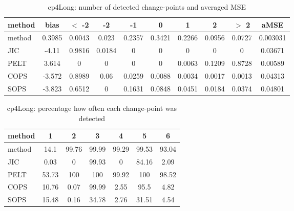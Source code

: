 \begin{table}[ht]
\centering
\begin{tabular}{l|c|ccccccc|c}
  \hline
method & bias & $<$ -2 & -2 & -1 & 0 & 1 & 2 & $>$ 2 & aMSE \\ 
  \hline
method & 0.3985 & 0.0043 & 0.023 & 0.2357 & 0.3421 & 0.2266 & 0.0956 & 0.0727 & 0.003031 \\ 
  JIC & -4.11 & 0.9816 & 0.0184 &     0 &     0 &     0 &     0 &     0 & 0.03671 \\ 
  PELT & 3.614 &     0 &     0 &     0 &     0 & 0.0063 & 0.1209 & 0.8728 & 0.00589 \\ 
  COPS & -3.572 & 0.8989 &  0.06 & 0.0259 & 0.0088 & 0.0034 & 0.0017 & 0.0013 & 0.04313 \\ 
  SOPS & -3.823 & 0.6512 &     0 & 0.1631 & 0.0848 & 0.0451 & 0.0184 & 0.0374 & 0.04801 \\ 
   \hline
\end{tabular}
\caption{cp4Long: number of detected change-points and averaged MSE} 
\label{tab:cp4LongNjumps}
\end{table}
\begin{table}[ht]
\centering
\begin{tabular}{l|cccccc}
  \hline
method & 1 & 2 & 3 & 4 & 5 & 6 \\ 
  \hline
method &   14.1 &  99.76 &  99.99 &  99.29 &  99.53 &  93.04 \\ 
  JIC &   0.03 &      0 &  99.93 &      0 &  84.16 &   2.09 \\ 
  PELT &  53.73 &    100 &    100 &  99.92 &    100 &  98.52 \\ 
  COPS &  10.76 &   0.07 &  99.99 &   2.55 &   95.5 &   4.82 \\ 
  SOPS &  15.48 &   0.16 &  34.78 &   2.76 &  31.51 &   4.54 \\ 
   \hline
\end{tabular}
\caption{cp4Long: percentage how often each change-point was detected} 
\label{tab:cp4LongDetections}
\end{table}
